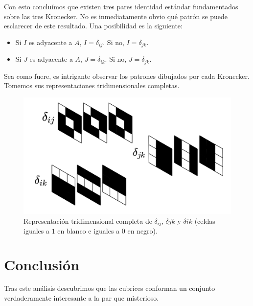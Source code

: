 \documentclass[a4paper, titlepage]{article}
\begin{document}
Con esto concluímos que existen tres pares identidad estándar fundamentados sobre las tres Kronecker. No es inmediatamente obvio qué patrón se puede esclarecer de este resultado. Una posibilidad es la siguiente:

\begin{itemize}
	\item Si $I$ es adyacente a $A$, $I = \delta_{ij}$. Si no, $I = \delta_{jk}$.
	\item Si $J$ es adyacente a $A$, $J = \delta_{ik}$. Si no, $J = \delta_{jk}$.
\end{itemize}

Sea como fuere, es intrigante observar los patrones dibujados por cada Kronecker. Tomemos sus representaciones tridimensionales completas.


\begin{figure}[H]
	\includegraphics[width=\linewidth]{kroneckers.png}
	\caption{Representación tridimensional completa de $\delta_{ij}$, $\delta{jk}$ y $\delta{ik}$ (celdas iguales a $1$ en blanco e iguales a $0$ en negro).}
\end{figure}

\section{Conclusión}

Tras este análisis descubrimos que las cubrices conforman un conjunto verdaderamente interesante a la par que misterioso. 
\end{document}
